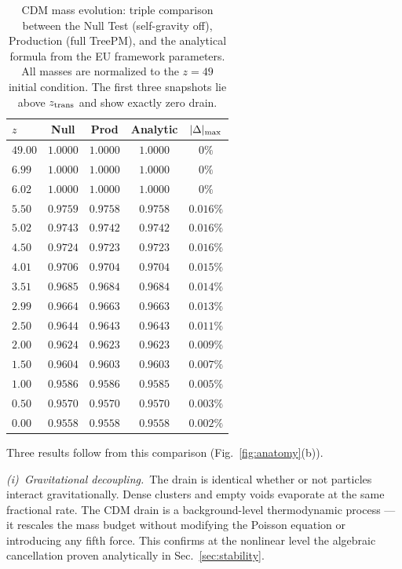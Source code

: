 \documentclass[a4paper,fleqn]{cas-dc}
\newcommand{\ztrans}{z_{\rm trans}}
\begin{document}
\begin{table}[t]
\caption{CDM mass evolution: triple comparison between the
Null Test (self-gravity off), Production (full TreePM),
and the analytical formula from the EU framework
parameters. All masses are normalized to the $z = 49$
initial condition. The first three snapshots lie above
$\ztrans$ and show exactly zero drain.}
\label{tab:drain_nbody}
\begin{tabular}{lcccc}
$z$ & Null & Prod & Analytic
  & $|\Delta|_{\rm max}$ \\
\hline
$49.00$ & $1.0000$ & $1.0000$ & $1.0000$
  & $0\%$ \\
$6.99$  & $1.0000$ & $1.0000$ & $1.0000$
  & $0\%$ \\
$6.02$  & $1.0000$ & $1.0000$ & $1.0000$
  & $0\%$ \\
\hline
$5.50$  & $0.9759$ & $0.9758$ & $0.9758$
  & $0.016\%$ \\
$5.02$  & $0.9743$ & $0.9742$ & $0.9742$
  & $0.016\%$ \\
$4.50$  & $0.9724$ & $0.9723$ & $0.9723$
  & $0.016\%$ \\
$4.01$  & $0.9706$ & $0.9704$ & $0.9704$
  & $0.015\%$ \\
$3.51$  & $0.9685$ & $0.9684$ & $0.9684$
  & $0.014\%$ \\
$2.99$  & $0.9664$ & $0.9663$ & $0.9663$
  & $0.013\%$ \\
$2.50$  & $0.9644$ & $0.9643$ & $0.9643$
  & $0.011\%$ \\
$2.00$  & $0.9624$ & $0.9623$ & $0.9623$
  & $0.009\%$ \\
$1.50$  & $0.9604$ & $0.9603$ & $0.9603$
  & $0.007\%$ \\
$1.00$  & $0.9586$ & $0.9586$ & $0.9585$
  & $0.005\%$ \\
$0.50$  & $0.9570$ & $0.9570$ & $0.9570$
  & $0.003\%$ \\
$0.00$  & $0.9558$ & $0.9558$ & $0.9558$
  & $0.002\%$ \\
\end{tabular}
\end{table}

Three results follow from this comparison
(Fig.~\ref{fig:anatomy}(b)).

\textit{(i)~Gravitational decoupling.}~The drain is
identical whether or not particles interact
gravitationally. Dense clusters and empty voids
evaporate at the same fractional rate. The CDM drain
is a background-level thermodynamic process ---
it rescales the mass budget without modifying the
Poisson equation or introducing any fifth force.
This confirms at the nonlinear level the algebraic
cancellation proven analytically in
Sec.~\ref{sec:stability}.
\end{document}
